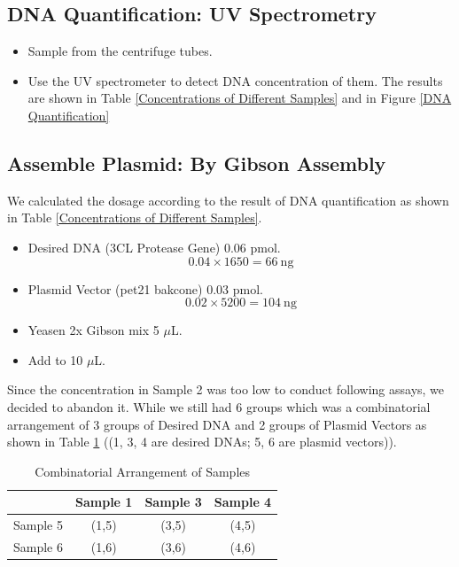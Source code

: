 \documentclass{article}
\begin{document}
\subsection{DNA Quantification:  UV Spectrometry}
\begin{itemize}
    \item Sample from the centrifuge tubes.
    \item Use the UV spectrometer to detect DNA concentration of them. The results are shown in Table \ref{Concentrations of Different Samples} and in Figure \ref{DNA Quantification}
\end{itemize}

\subsection{Assemble Plasmid: By Gibson Assembly}
We calculated the dosage according to the result of DNA quantification as shown in Table \ref{Concentrations of Different Samples}.
\begin{itemize}
    \item Desired DNA (3CL Protease Gene) 0.06 pmol.
$$
0.04\times 1650 = 66\ \mathrm{ng}
$$

    \item Plasmid Vector (pet21 bakcone) 0.03 pmol.
$$
0.02\times 5200 = 104\ \mathrm{ng}
$$
    \item Yeasen 2x Gibson mix 5 $\mu$L.
    \item Add  to 10  $\mu$L.


\end{itemize}
Since the concentration in Sample 2 was too low to conduct following assays, we decided to abandon it. While we still had 6 groups which was a combinatorial arrangement of  3 groups of Desired DNA and 2 groups of Plasmid Vectors as shown in Table \ref{Combinatorial Arrangement of Samples} ((1, 3, 4 are desired DNAs; 5, 6 are plasmid vectors)).

\begin{table}
    \centering
    \begin{tabular}{|c|c|c|c|} \hline 
         &  Sample 1&  Sample 3& Sample 4\\ \hline 
         Sample 5&  (1,5)&  (3,5)& (4,5)\\ \hline 
         Sample 6&  (1,6)&  (3,6)& (4,6)\\ \hline
    \end{tabular}
    \caption{Combinatorial Arrangement of Samples }
    \label{Combinatorial Arrangement of Samples}
\end{table}
\end{document}
